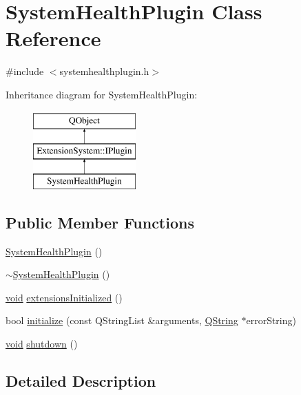 \hypertarget{class_system_health_plugin}{\section{System\-Health\-Plugin Class Reference}
\label{class_system_health_plugin}
}


{\ttfamily \#include $<$systemhealthplugin.\-h$>$}

Inheritance diagram for System\-Health\-Plugin\-:\begin{figure}[H]
\begin{center}
\leavevmode
\includegraphics[height=3.000000cm]{class_system_health_plugin}
\end{center}
\end{figure}
\subsection*{Public Member Functions}
\begin{DoxyCompactItemize}
\item 
\hyperlink{group___system_health_plugin_gaccd196e55a7a3a7b48fcc59ee62a5a8b}{System\-Health\-Plugin} ()
\item 
\hyperlink{group___system_health_plugin_ga8c480b9596c0968c7bece8bb13874fd5}{$\sim$\-System\-Health\-Plugin} ()
\item 
\hyperlink{group___u_a_v_objects_plugin_ga444cf2ff3f0ecbe028adce838d373f5c}{void} \hyperlink{group___system_health_plugin_gac8ab8add53079a86d3ab978ac8c41438}{extensions\-Initialized} ()
\item 
bool \hyperlink{group___system_health_plugin_ga0b4b0272fcc0fd567c889344ee5f68d5}{initialize} (const Q\-String\-List \&arguments, \hyperlink{group___u_a_v_objects_plugin_gab9d252f49c333c94a72f97ce3105a32d}{Q\-String} $\ast$error\-String)
\item 
\hyperlink{group___u_a_v_objects_plugin_ga444cf2ff3f0ecbe028adce838d373f5c}{void} \hyperlink{group___system_health_plugin_gacf43a9878cbe82c0cf68216d045bc158}{shutdown} ()
\end{DoxyCompactItemize}


\subsection{Detailed Description}


